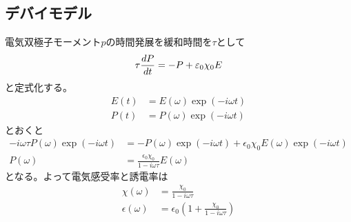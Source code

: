 \subsection{デバイモデル}
    電気双極子モーメント$p$の時間発展を緩和時間を$\tau$として
        \[\tau\de[P]{t} = -P + \epsilon_0\chi_0 E\]
    と定式化する。
    \begin{align*}
        E(t) &= E(\omega)\exp(-i\omega t)\\
        P(t) &= P(\omega)\exp(-i\omega t)
    \end{align*}
    とおくと
    \begin{align*}
        -i\omega\tau P(\omega)\exp(-i\omega t) &= -P(\omega)\exp(-i\omega t) + \epsilon_0\chi_0E(\omega)\exp(-i\omega t)\\
        P(\omega) &= \frac{\epsilon_0\chi_0}{1 - i\omega\tau}E(\omega)
    \end{align*}
    となる。よって電気感受率と誘電率は
    \begin{align*}
        \chi(\omega) &= \frac{\chi_0}{1 - i\omega\tau}\\
        \epsilon(\omega) &= \epsilon_0\left(1 + \frac{\chi_0}{1 - i\omega\tau}\right)
    \end{align*}